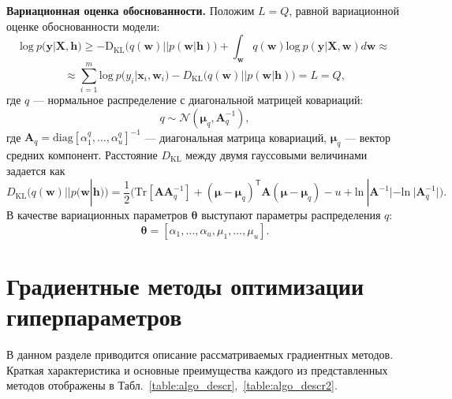 \textbf{Вариационная оценка обоснованности. }
Положим $L=Q$, равной вариационной оценке обоснованности модели:
\begin{equation} 
\text{log}~p(\mathbf{y}|\mathbf{X},\mathbf{h})  
\geq 
-\text{D}_\text{KL} \bigl(q(\mathbf{w})||p(\mathbf{w}|\mathbf{h})\bigr) + \int_{\mathbf{w}} q(\mathbf{w})\text{log}~{p(\mathbf{y}|\mathbf{X},\mathbf{w})} d \mathbf{w}  \approx
\label{eq:hyper_elbo}
\end{equation}
\[
\approx \sum_{i=1}^m \text{log}~p({y}_i|\mathbf{x}_i, \mathbf{w}_i) - D_\text{KL}\bigl(q (\mathbf{w}) || p (\mathbf{w}|\mathbf{h})\bigr) = L = Q,
\]
где $q$ --- нормальное распределение с диагональной матрицей ковариаций:
\begin{equation}
	q \sim \mathcal{N}(\boldsymbol{\mu}_q, \mathbf{A}^{-1}_q),
\label{eq:diag}
\end{equation}
где $\mathbf{A}_q = \text{diag}[\alpha^q_1, \dots, \alpha^q_u]^{-1}$ --- диагональная матрица ковариаций, $\boldsymbol{\mu}_q$ --- вектор средних компонент.
Расстояние $D_\text{KL}$ между двумя гауссовыми величинами задается как 
\[
	D_\text{KL}\bigl(q (\mathbf{w}) || p (\mathbf{w}|\mathbf{h})\bigr) = \frac{1}{2} \bigl( \text{Tr} [\mathbf{A}\mathbf{A}^{-1}_q] + (\boldsymbol{\mu} - \boldsymbol{\mu}_q)^\mathsf{T}\mathbf{A}(\boldsymbol{\mu} - \boldsymbol{\mu}_q) - u +\text{ln}~|\mathbf{A}^{-1}| - \text{ln}~|\mathbf{A}_q^{-1}| \bigr).
\]
В качестве вариационных параметров $\boldsymbol{\theta}$ выступают параметры распределения $q$:
\[
\boldsymbol{\theta} = [\alpha_1, \dots, \alpha_u, {\mu}_1,\dots,{\mu}_u].
\]




\section{Градиентные методы оптимизации гиперпараметров}
В данном разделе приводится описание рассматриваемых градиентных методов.
Краткая характеристика и основные преимущества каждого из представленных методов отображены в Табл.~\ref{table:algo_descr},~\ref{table:algo_descr2}.

